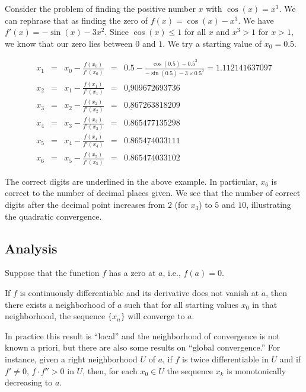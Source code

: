 \begin{example}
{\rm
Consider the problem of finding the positive number $x$ with 
$\cos(x) = x^3$. We can rephrase that as finding the zero of 
$f(x) = \cos(x) - x^3$. We have $f'(x) = -\sin(x) - 3x^2$. 
Since $\cos(x) \leq 1$ for all $x$ and $x^3 > 1$ for $x>1$, 
we know that our zero lies between $0$ and $1$. We try a starting 
value of $x_0 = 0.5$.

\[
\begin{array}{lllll} 
x_1 & = & x_0 - \frac{f(x_0)}{f'(x_0)} & 
= & 0.5 - \frac{\cos(0.5) - 0.5^3}{-\sin(0.5) - 3 \times 0.5^2} =  1.112141637097 \\ 
x_2 & = & x_1 - \frac{f(x_1)}{f'(x_1)} & = & \underline{0.9}09672693736 \\ 
x_3 &= & x_2 - \frac{f(x_2)}{f'(x_2)} & = & \underline{0.86}7263818209 \\ 
x_4 &= & x_3 - \frac{f(x_3)}{f'(x_3)} & = & \underline{0.86547}7135298 \\ 
x_5 &= & x_4 - \frac{f(x_4)}{f'(x_4)} & = & \underline{0.8654740331}11 \\ 
x_6 &= & x_5 - \frac{f(x_5)}{f'(x_5)} & = & \underline{0.865474033102} 
\end{array}
\]

The correct digits are underlined in the above example. In 
particular, $x_6$ is correct to the number of decimal places 
given. We see that the number of correct digits after the 
decimal point increases from $2$ (for $x_3$) to $5$ and $10$, 
illustrating the quadratic convergence.
}
\end{example}

\subsection{Analysis}

Suppose that the function $f$ has a zero at $a$, i.e., $f(a) = 0$.

If $f$ is continuously differentiable and its derivative does not vanish 
at $a$, then there exists a neighborhood of $a$ such that for 
all starting values $x_0$ in that neighborhood, the sequence 
$\{x_n\}$ will converge to $a$.

In practice this result is ``local'' and the neighborhood of 
convergence is not known a priori, but there are also some results 
on ``global convergence.'' For instance, given a right neighborhood 
$U$ of $a$, if $f$ is twice differentiable in $U$ and if 
$f' \ne 0$, $f \cdot f'' > 0$ in $U$, then, for each $x_0\in U$ the 
sequence $x_k$ is monotonically decreasing to $a$.

